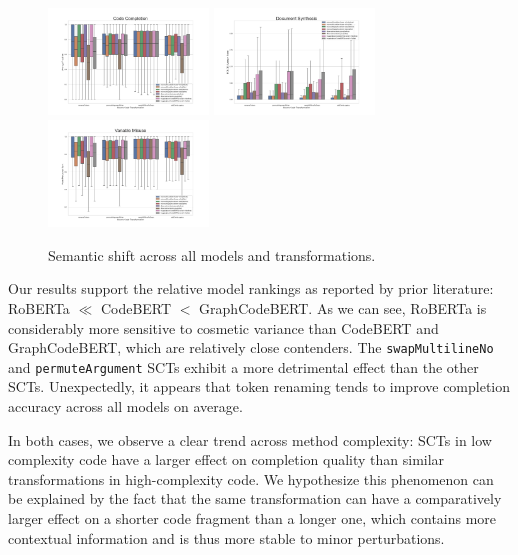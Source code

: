 \documentclass[usenames,dvipsnames]{article} %
\begin{document}
  \vspace{-10pt}\begin{figure}[H]
                  \centering\hspace*{-0.6cm}
                  \includegraphics[width=0.38\textwidth]{figs/Code Completion}\hspace*{-0.6cm}
                  \includegraphics[width=0.38\textwidth]{figs/Document Synthesis}\hspace*{-0.6cm}
                  \includegraphics[width=0.38\textwidth]{figs/Variable Misuse}
                  \caption{Semantic shift across all models and transformations.}
                  \label{fig:dataflow}
  \end{figure}

  Our results support the relative model rankings as reported by prior literature: RoBERTa $\ll$ CodeBERT $<$ GraphCodeBERT. As we can see, RoBERTa is considerably more sensitive to cosmetic variance than CodeBERT and GraphCodeBERT, which are relatively close contenders. The \lstinline|swapMultilineNo| and \lstinline|permuteArgument| SCTs exhibit a more detrimental effect than the other SCTs. Unexpectedly, it appears that token renaming tends to improve completion accuracy across all models on average.

  In both cases, we observe a clear trend across method complexity: SCTs in low complexity code have a larger effect on completion quality than similar transformations in high-complexity code. We hypothesize this phenomenon can be explained by the fact that the same transformation can have a comparatively larger effect on a shorter code fragment than a longer one, which contains more contextual information and is thus more stable to minor perturbations.
\end{document}
